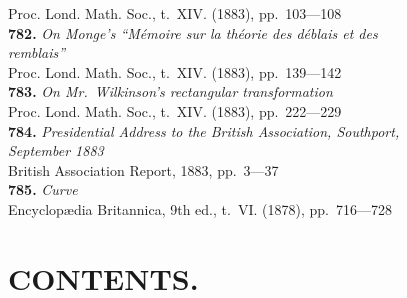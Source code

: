\documentclass[11pt,a4paper]{book}
\begin{document}
\hspace*{2em}Proc. Lond. Math. Soc., t.~XIV. (1883), pp.~103---108\\[0.3em]
\textbf{782.} \textit{On Monge's ``M\'emoire sur la th\'eorie des d\'eblais et des}\\
\hspace*{2em}\textit{remblais''} \\
\hspace*{2em}Proc. Lond. Math. Soc., t.~XIV. (1883), pp.~139---142\\[0.3em]
\textbf{783.} \textit{On Mr.~Wilkinson's rectangular transformation} \\
\hspace*{2em}Proc. Lond. Math. Soc., t.~XIV. (1883), pp.~222---229\\[0.3em]
\textbf{784.} \textit{Presidential Address to the British Association, Southport,}\\
\hspace*{2em}\textit{September 1883} \\
\hspace*{2em}British Association Report, 1883, pp.~3---37\\[0.3em]
\textbf{785.} \textit{Curve} \\
\hspace*{2em}Encyclop\ae{}dia Britannica, 9th ed., t.~VI. (1878), pp.~716---728

\cleardoublepage

\chapter*{CONTENTS.}
\end{document}

